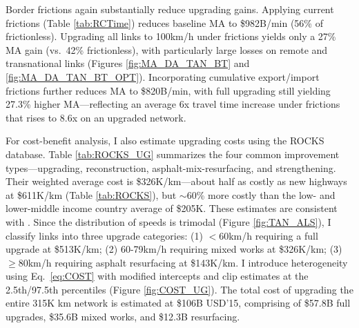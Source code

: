 \documentclass[a4paper]{article}
\begin{document}
Border frictions again substantially reduce upgrading gains. Applying current frictions (Table \ref{tab:RCTime}) reduces baseline MA to \$982B/min (56\% of frictionless). Upgrading all links to 100km/h under frictions yields only a 27\% MA gain (vs.\ 42\% frictionless), with particularly large losses on remote and transnational links (Figures \ref{fig:MA_DA_TAN_BT} and \ref{fig:MA_DA_TAN_BT_OPT}). Incorporating cumulative export/import frictions further reduces MA to \$820B/min, with full upgrading still yielding 27.3\% higher MA---reflecting an average 6x travel time increase under frictions that rises to 8.6x on an upgraded network. \newline


For cost-benefit analysis, I also estimate upgrading costs using the ROCKS database. Table \ref{tab:ROCKS_UG} summarizes the four common improvement types---upgrading, reconstruction, asphalt-mix-resurfacing, and strengthening. Their weighted average cost is \$326K/km---about half as costly as new highways at \$611K/km (Table \ref{tab:ROCKS}), but $\sim$60\% more costly than the low- and lower-middle income country average of \$205K. These estimates are consistent with \citet{AfDB2014}. Since the distribution of speeds is trimodal (Figure \ref{fig:TAN_ALS}), I classify links into three upgrade categories: (1) $<$60km/h requiring a full upgrade at \$513K/km; (2) 60-79km/h requiring mixed works at \$326K/km; (3) $\geq$80km/h requiring asphalt resurfacing at \$143K/km. I introduce heterogeneity using Eq.\ \ref{eq:COST} with modified intercepts and clip estimates at the 2.5th/97.5th percentiles (Figure \ref{fig:COST_UG}). The total cost of upgrading the entire 315K km network is estimated at \$106B USD'15, comprising of \$57.8B full upgrades, \$35.6B mixed works, and \$12.3B resurfacing. \newline


\end{document}

